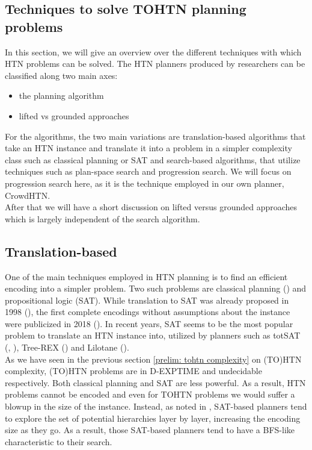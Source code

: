 \subsection{Techniques to solve TOHTN planning problems}
In this section, we will give an overview over the different techniques with which HTN problems can be solved. The HTN planners produced by researchers can be classified along two main axes:
\begin{itemize}
	\item the planning algorithm
	\item lifted vs grounded approaches
\end{itemize}
For the algorithms, the two main variations are translation-based algorithms that take an HTN instance and translate it into a problem in a simpler complexity class such as classical planning or SAT and search-based algorithms, that utilize techniques such as plan-space search and progression search. We will focus on progression search here, as it is the technique employed in our own planner, CrowdHTN. \\
After that we will have a short discussion on lifted versus grounded approaches which is largely independent of the search algorithm.
\begin{comment}
- multiple ways to solve HTN instances
- planners can be classified on two axis: the algorithm and lifted vs grounded
- in practise, most algorithms are based on translation to SAT or on search algorithms
- we will focus on search-based as we will see in later section \ref{prelim: crowdhtn} that this is what our own planner utilizes
\end{comment}

\subsection{Translation-based} 
\label{prelim: translation based planners}
One of the main techniques employed in HTN planning is to find an efficient encoding into a simpler problem. Two such problems are classical planning (\cite{alford2016bound}) and propositional logic (SAT). While translation to SAT was already proposed in 1998 (\cite{mali1998encoding}), the first complete encodings without assumptions about the instance were publicized in 2018 (\cite{behnke2018totsat}). In recent years, SAT seems to be the most popular problem to translate an HTN instance into, utilized by planners such as totSAT (\cite{behnke2018totsat}, \cite{behnke2018tracking}), Tree-REX (\cite{schreiber2019tree}) and Lilotane (\cite{schreiber2021lilotane}). \\
As we have seen in the previous section \ref{prelim: tohtn complexity} on (TO)HTN complexity, (TO)HTN problems are in D-EXPTIME and undecidable respectively. Both classical planning and SAT are less powerful. As a result, HTN problems cannot be encoded and even for TOHTN problems we would suffer a blowup in the size of the instance. Instead, as noted in \cite{schreiber2019tree}, SAT-based planners tend to explore the set of potential hierarchies layer by layer, increasing the encoding size as they go. As a result, those SAT-based planners tend to have a BFS-like characteristic to their search.

